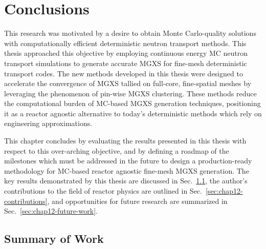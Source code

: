 \chapter{Conclusions}
\label{chap:conclusions-future-work}

This research was motivated by a desire to obtain Monte Carlo-quality solutions with computationally efficient deterministic neutron transport methods. This thesis approached this objective by employing continuous energy \ac{MC} neutron transport simulations to generate accurate \ac{MGXS} for fine-mesh deterministic transport codes. The new methods developed in this thesis were designed to accelerate the convergence of \ac{MGXS} tallied on full-core, fine-spatial meshes by leveraging the phenomenon of pin-wise \ac{MGXS} clustering. These methods reduce the computational burden of \ac{MC}-based \ac{MGXS} generation techniques, positioning it as a reactor agnostic alternative to today's deterministic methods which rely on engineering approximations.

This chapter concludes by evaluating the results presented in this thesis with respect to this over-arching objective, and by defining a roadmap of the milestones which must be addressed in the future to design a production-ready methodology for \ac{MC}-based reactor agnostic fine-mesh \ac{MGXS} generation. The key results demonstrated by this thesis are discussed in Sec.~\ref{sec:chap12-conclusions}, the author's contributions to the field of reactor physics are outlined in Sec.~\ref{sec:chap12-contributions}, and opportunities for future research are summarized in Sec.~\ref{sec:chap12-future-work}.



\section{Summary of Work}
\label{sec:chap12-conclusions}

